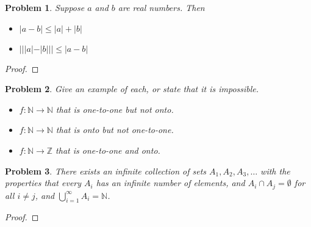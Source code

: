 \documentclass[12pt]{article}
\newtheorem{problem}{Problem}
\newcommand{\NN}{\ensuremath{\mathbb N}}
\newcommand{\ZZ}{\ensuremath{\mathbb Z}}
\begin{document}
\begin{problem} %
Suppose $a$ and $b$ are real numbers.  Then
\begin{itemize}
\item[(a)] $|a-b| \le |a|+|b|$
\item[(b)] $\big|||a|-|b||\big| \le |a-b|$
\end{itemize}
\end{problem}


\begin{proof}
%
\end{proof}


\begin{problem} %
Give an example of each, or state that it is impossible.
\begin{itemize}
\item[(a)] $f:\NN\to\NN$ that is one-to-one but not onto.

\item[(b)] $f:\NN\to\NN$ that is onto but not one-to-one.

\item[(d)] $f:\NN\to\ZZ$ that is one-to-one and onto.

\end{itemize}
\end{problem}



\begin{problem} %
There exists an infinite collection of sets $A_1,A_2,A_3,\dots$ with the properties that every $A_i$ has an infinite number of elements, and $A_i\cap A_j=\emptyset$ for all $i\ne j$, and $\bigcup_{i=1}^\infty A_i=\NN$. \end{problem}

\begin{proof}
\end{proof}
\end{document}
